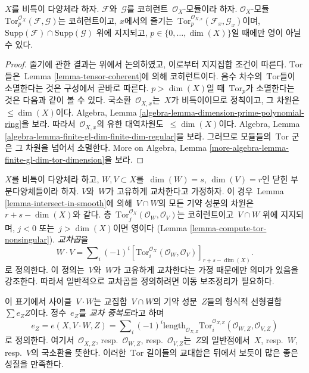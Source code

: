 \begin{lemma}
\label{lemma-compute-tor-nonsingular}
$X$를 비특이 다양체라 하자.
$\mathcal{F}$와\  $\mathcal{G}$를 코히런트\  $\mathcal{O}_X$-모듈이라 하자.
$\mathcal{O}_X$-모듈\ 
$\text{Tor}_p^{\mathcal{O}_X}(\mathcal{F}, \mathcal{G})$는 코히런트이고,
$x$에서의 줄기는\ 
$\text{Tor}_p^{\mathcal{O}_{X, x}}(\mathcal{F}_x, \mathcal{G}_x)$이며,
$\text{Supp}(\mathcal{F}) \cap \text{Supp}(\mathcal{G})$ 위에 지지되고,
$p \in \{0, \ldots, \dim(X)\}$일 때에만 영이 아닐 수 있다.
\end{lemma}

\begin{proof}
줄기에 관한 결과는 위에서 논의하였고, 이로부터 지지집합 조건이 따른다.
$\text{Tor}$들은\  Lemma \ref{lemma-tensor-coherent}에 의해 코히런트이다.
음수 차수의\  $\text{Tor}$들이 소멸한다는 것은 구성에서 곧바로 따른다.
$p > \dim(X)$일 때\  $\text{Tor}_p$가 소멸한다는 것은 다음과 같이 볼 수
있다. 국소환\  $\mathcal{O}_{X, x}$는\  $X$가 비특이이므로 정칙이고,
그 차원은\  $\leq \dim(X)$이다. Algebra, Lemma
\ref{algebra-lemma-dimension-prime-polynomial-ring}을 보라.
따라서\  $\mathcal{O}_{X, x}$의 유한 대역차원도\  $\leq \dim(X)$이다.
Algebra, Lemma
\ref{algebra-lemma-finite-gl-dim-finite-dim-regular}을 보라.
그러므로 모듈들의\  $\text{Tor}$ 군은 그 차원을 넘어서 소멸한다.
More on Algebra, Lemma
\ref{more-algebra-lemma-finite-gl-dim-tor-dimension}을 보라.
\end{proof}

\noindent
$X$를 비특이 다양체라 하고, $W, V \subset X$를\ 
$\dim(W) = s$, $\dim(V) = r$인 닫힌 부분다양체들이라 하자.
$V$와\  $W$가 고유하게 교차한다고 가정하자.
이 경우\  Lemma \ref{lemma-intersect-in-smooth}에 의해\  $V \cap W$의 모든
기약 성분의 차원은\  $r + s - \dim(X)$와 같다.
층\  $\text{Tor}_j^{\mathcal{O}_X}(\mathcal{O}_W, \mathcal{O}_V)$는
코히런트이고\  $V \cap W$ 위에 지지되며,
$j < 0$ 또는\  $j > \dim(X)$이면 영이다
(Lemma \ref{lemma-compute-tor-nonsingular}).
{\it 교차곱}을
$$
W \cdot V = \sum\nolimits_i (-1)^i
[\text{Tor}_i^{\mathcal{O}_X}(\mathcal{O}_W, \mathcal{O}_V)]_{r + s - \dim(X)}.
$$
로 정의한다. 이 정의는\  $V$와\  $W$가 고유하게 교차한다는 가정 때문에만
의미가 있음을 강조한다. 따라서 일반적으로 교차곱을 정의하려면 이동
보조정리가 필요하다.

\medskip\noindent
이 표기에서 사이클\  $V \cdot W$는 교집합\  $V \cap W$의 기약 성분\  $Z$들의
형식적 선형결합\  $\sum e_Z Z$이다. 정수\  $e_Z$를 {\it 교차 중복도}라고 하며
$$
e_Z = e(X, V \cdot W, Z) =
\sum\nolimits_i
(-1)^i
\text{length}_{\mathcal{O}_{X, Z}}
\text{Tor}_i^{\mathcal{O}_{X, Z}}(\mathcal{O}_{W, Z}, \mathcal{O}_{V, Z})
$$
로 정의한다. 여기서\  $\mathcal{O}_{X, Z}$, resp.\ $\mathcal{O}_{W, Z}$,
resp.\ $\mathcal{O}_{V, Z}$는\  $Z$의 일반점에서\  $X$, resp.\ $W$,
resp.\ $V$의 국소환을 뜻한다.
이러한\  $\text{Tor}$ 길이들의 교대합은 뒤에서 보듯이 많은 좋은 성질을
만족한다.

